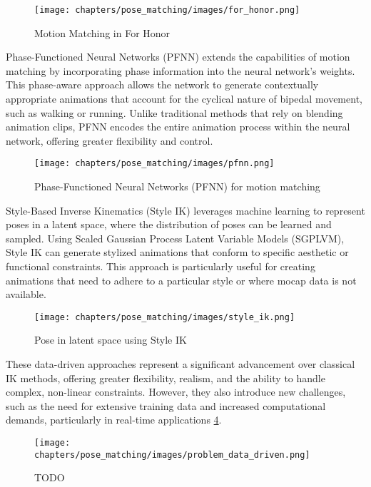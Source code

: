 \documentclass[../../main.tex]{subfiles}
\begin{document}
\begin{figure}
  \centering \texttt{[image: chapters/pose\_matching/images/for\_honor.png]}
  \caption{Motion Matching in For Honor}
  \label{fig:for_honor}
\end{figure}

Phase-Functioned Neural Networks (PFNN) \cite{TODO} extends the capabilities of motion matching by incorporating phase information into the neural network's weights. This phase-aware approach allows the network to generate contextually appropriate animations that account for the cyclical nature of bipedal movement, such as walking or running. Unlike traditional methods that rely on blending animation clips, PFNN encodes the entire animation process within the neural network, offering greater flexibility and control.

\begin{figure}
  \centering \texttt{[image: chapters/pose\_matching/images/pfnn.png]}
  \caption{Phase-Functioned Neural Networks (PFNN) for motion matching}
  \label{fig:pfnn}
\end{figure}

Style-Based Inverse Kinematics (Style IK) leverages machine learning to represent poses in a latent space, where the distribution of poses can be learned and sampled. Using Scaled Gaussian Process Latent Variable Models (SGPLVM), Style IK can generate stylized animations that conform to specific aesthetic or functional constraints. This approach is particularly useful for creating animations that need to adhere to a particular style or where mocap data is not available\cite{TODO}.

\begin{figure}
  \centering \texttt{[image: chapters/pose\_matching/images/style\_ik.png]}
  \caption{Pose in latent space using Style IK}
  \label{fig:style_ik}
\end{figure}

These data-driven approaches represent a significant advancement over classical IK methods, offering greater flexibility, realism, and the ability to handle complex, non-linear constraints. However, they also introduce new challenges, such as the need for extensive training data and increased computational demands, particularly in real-time applications \ref{fig:problem_data_driven}.

\begin{figure}
  \centering \texttt{[image: chapters/pose\_matching/images/problem\_data\_driven.png]}
  \caption{TODO}
  \label{fig:problem_data_driven}
\end{figure}
\end{document}
